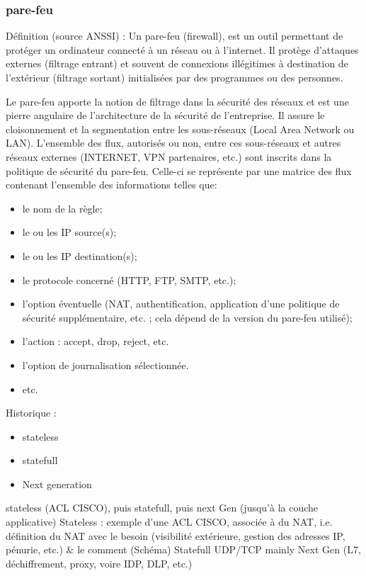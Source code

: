 \subsubsection{pare-feu}
Définition (source ANSSI) :
Un pare-feu (firewall), est un outil permettant de protéger un ordinateur connecté à un réseau ou à l’internet. Il protège d’attaques externes (filtrage entrant) et souvent de connexions illégitimes à destination de l’extérieur (filtrage sortant) initialisées par des programmes ou des personnes.

Le pare-feu apporte la notion de filtrage dans la sécurité des réseaux et est une pierre angulaire de l'architecture de la sécurité de l'entreprise.
Il assure le cloisonnement et la segmentation entre les sous-réseaux (Local Area Network ou LAN).
L'ensemble des flux, autorisés ou non, entre ces sous-réseaux et autres réseaux externes (INTERNET, VPN partenaires, etc.) sont inscrits dans la politique de sécurité du pare-feu.
Celle-ci se représente par une matrice des flux contenant l'ensemble des informations telles que:
\begin{itemize}
    \item le nom de la règle;
    \item le ou les IP source(s);
    \item le ou les IP destination(s);
    \item le protocole concerné (HTTP, FTP, SMTP, etc.);
    \item l'option éventuelle (NAT, authentification, application d'une politique de sécurité supplémentaire, etc. ; cela dépend de la version du pare-feu utilisé);
    \item l'action : accept, drop, reject, etc.
    \item l'option de journalisation sélectionnée.
    \item etc.
\end{itemize}

Historique : 
\begin{itemize}
    \item stateless
    \item statefull
    \item Next generation
\end{itemize}

stateless (ACL CISCO), puis statefull, puis next Gen (jusqu’à la couche applicative)
Stateless : exemple d’une ACL CISCO, associée à du NAT, i.e. définition du NAT avec le besoin (visibilité extérieure, gestion des adresses IP, pénurie, etc.) \& le comment (Schéma)
Statefull UDP/TCP mainly
Next Gen (L7, déchiffrement, proxy, voire IDP, DLP, etc.)

